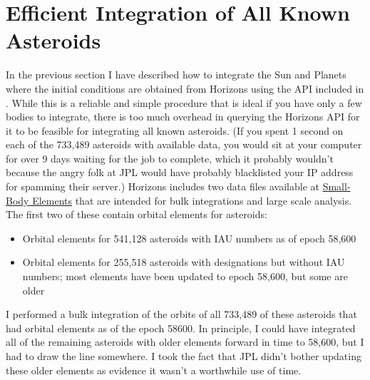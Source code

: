 \section{Efficient Integration of All Known Asteroids}
\label{section_integrate_known_asteroids}
In the previous section I have described how to integrate the Sun and Planets where the initial conditions
are obtained from Horizons using the API included in .
While this is a reliable and simple procedure that is ideal if you have only a few bodies to integrate,
there is too much overhead in querying the Horizons API for it to be feasible for integrating all known asteroids.
(If you spent 1 second on each of the 733,489 asteroids with available data, 
you would sit at your computer for over 9 days waiting for the job to complete,
which it probably wouldn't because the angry folk at JPL would have probably blacklisted your IP address
for spamming their server.)
Horizons includes two data files available at \href{https://ssd.jpl.nasa.gov/?sb_elem}{Small-Body Elements}
that are intended for bulk integrations and large scale analysis.
The first two of these contain orbital elements for asteroids:
\begin{itemize}
\item Orbital elements for 541,128 asteroids with IAU numbers as of epoch 58,600
\item Orbital elements for 255,518 asteroids with designations but without IAU numbers; 
most elements have been updated to epoch 58,600, but some are older
\end{itemize}
I performed a bulk integration of the orbits of all 733,489 of these asteroids that had orbital elements as of the epoch 58600.
In principle, I could have integrated all of the remaining asteroids with older elements forward in time to 58,600, but I had to draw the line somewhere.
I took the fact that JPL didn't bother updating these older elements as evidence it wasn't a worthwhile use of time.

